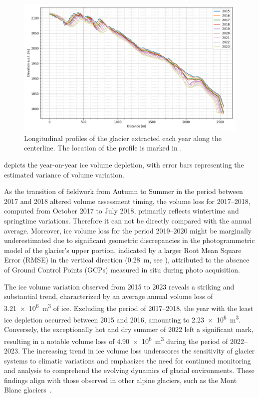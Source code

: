 \begin{figure}[ht]
  \centering
  \includegraphics[width=\textwidth]{longitudinal_profiles.png}
  \caption{Longitudinal profiles of the glacier extracted each year along the centerline. The location of the profile is marked in .}
  \label{fig:3:profile_long}
\end{figure}

 depicts the year-on-year ice volume depletion, with error bars 
representing the estimated variance of volume variation. 

As the transition of fieldwork from Autumn to Summer in the period between 2017 and 2018 altered 
volume assessment timing, the volume loss for 2017--2018, computed from October 2017 to July 2018, 
primarily reflects wintertime and springtime variations.
Therefore it can not be directly compared with the annual average.
Moreover, ice volume loss for the period 2019--2020 might be marginally underestimated due to
significant geometric discrepancies in the photogrammetric model of the glacier's upper portion,
indicated by a larger Root Mean Square Error (RMSE) in the vertical direction (\SI{0.28}{\meter}, 
see ), attributed to the absence of Ground Control Points (GCPs) measured 
in situ during photo acquisition. 

The ice volume variation observed from 2015 to 2023 reveals a striking and substantial trend, 
characterized by an average annual volume loss of \SI{3.21e6}{\cubic\meter} of ice. 
Excluding the period of 2017--2018, the year with the least ice depletion occurred between 2015 and 2016,
amounting to \SI{2.23e6}{\cubic\meter}. 
Conversely, the exceptionally hot and dry summer of 2022 left a significant mark, resulting in a notable volume 
loss of \SI{4.90e6}{\cubic\meter} during the period of 2022--2023.
The increasing trend in ice volume loss underscores the sensitivity of glacier systems to climatic variations and 
emphasizes the need for continued monitoring and analysis to comprehend the evolving dynamics of glacial environments.
These findings align with those observed in other alpine glaciers, such as the Mont Blanc glaciers~\citep{Berthier2023b_exceptional_thinning}.

